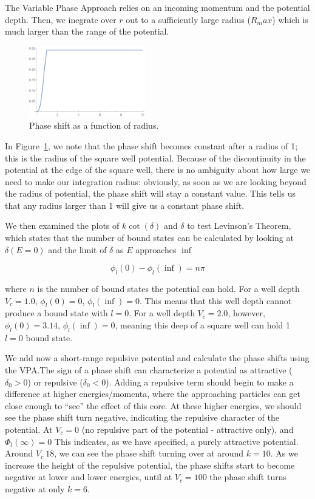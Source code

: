 \documentclass[10pt,showpacs,preprintnumbers,footinbib,amsmath,amssymb,aps,prl,twocolumn,groupedaddress,superscriptaddress,showkeys]{revtex4-1}
\begin{document}
The Variable Phase Approach relies on an incoming momentum and the potential depth.
Then, we inegrate over $r$ out to a sufficiently large radius ($R_max$) which is much larger
than the range of the potential. 

\begin{figure}
\centering
\includegraphics[width=0.45\textwidth]{figures/VPA_plot.pdf}
\caption{Phase shift as a function of radius.}
\label{fig:VPA}
\end{figure}

In Figure~\ref{fig:VPA}, we note that the phase shift becomes constant after a radius of 1;
this is the radius of the square well potential. Because of the discontinuity in the potential at the
edge of the square well, there is no ambiguity about how large we need to make our integration
radius: obviously, as soon as we are looking beyond the radius of potential, the phase shift will
stay a constant value. This tells us that any radius larger than 1 will give us a constant phase shift.

We then examined the plots of $k\cot(\delta)$ and $\delta$ to test Levinson's Theorem,
which states that the number of bound states can be calculated by looking at $\delta(E=0)$
and the limit of $\delta$ as $E$ approaches $\inf$

\begin{equation*}
	\phi_l(0)-\phi_l(\inf)=n\pi
\end{equation*}

where $n$ is the number of bound states the potential can hold. For a well depth $V_c=1.0$,
$\phi_l(0)=0$,  $\phi_l(\inf)=0$. This means that this well depth cannot produce a bound state
with $l=0$. For a well depth $V_c=2.0$, however,  $\phi_l(0)=3.14$,  $\phi_l(\inf)=0$, meaning
this deep of a square  well can hold 1 $l=0$ bound state.

We add now a short-range repulsive potential and calculate the phase shifts using the VPA.The
sign of a phase shift can characterize a potential as attractive ($\delta_0>0$) or repulsive
($\delta_0<0$). Adding a repulsive term should begin to make a difference at higher
energies/momenta, where the approaching particles can get close enough to ``see'' the effect of
this core. At these higher energies, we should see the phase shift turn negative, indicating the
repulsive character of the potential. At $V_c=0$ (no repulsive part of the potential - attractive
only), and $\Phi_l(\infty)=0$ This indicates, as we have specified, a purely attractive potential.
Around $V_c~18$, we can see the phase shift turning over at around $k=10$. As we increase
the height of the repulsive potential, the phase shifts start to become negative at lower and
lower energies, until at $V_c=100$ the phase shift turns negative at only $k=6$. 
\end{document}
